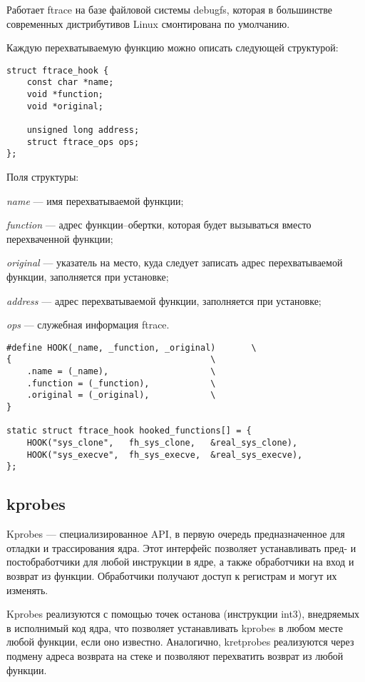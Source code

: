 Работает ftrace на базе файловой системы debugfs, которая в большинстве современных дистрибутивов Linux смонтирована по умолчанию. 

Каждую перехватываемую функцию можно описать следующей структурой:

\begin{lstlisting}[label=code:ftracehook,caption=Структура ftrace\_hook]
struct ftrace_hook {
	const char *name;
	void *function;
	void *original;
	
	unsigned long address;
	struct ftrace_ops ops;
};
\end{lstlisting}

Поля структуры:

\textit{name} --- имя перехватываемой функции;

\textit{function} ---  адрес функции--обертки, которая будет вызываться вместо перехваченной функции;

\textit{original} ---  указатель на место, куда следует записать адрес перехватываемой функции, заполняется при установке;

\textit{address} --- адрес перехватываемой функции, заполняется при установке;

\textit{ops} --- служебная информация ftrace.

\begin{lstlisting}[label=code:ftracehookexm,caption=Пример заполнения структуры ftrace\_hook]
#define HOOK(_name, _function, _original)       \
{                                       \
	.name = (_name),                    \
	.function = (_function),            \
	.original = (_original),            \
}
	
static struct ftrace_hook hooked_functions[] = {
	HOOK("sys_clone",   fh_sys_clone,   &real_sys_clone),
	HOOK("sys_execve",  fh_sys_execve,  &real_sys_execve),
};
\end{lstlisting}

\subsection{kprobes}

Kprobes --- специализированное API, в первую очередь предназначенное для отладки и трассирования ядра. Этот интерфейс позволяет устанавливать пред- и постобработчики для любой инструкции в ядре, а также обработчики на вход и возврат из функции. Обработчики получают доступ к регистрам и могут их изменять.

Kprobes реализуются с помощью точек останова (инструкции int3), внедряемых в исполнимый код ядра, что позволяет устанавливать kprobes в любом месте любой функции, если оно известно. Аналогично, kretprobes реализуются через подмену адреса возврата на стеке и позволяют перехватить возврат из любой функции.


